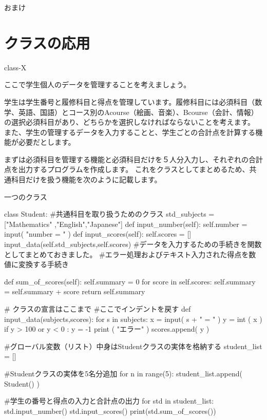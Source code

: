 \documentclass[11pt,a4paper,dvipdfmx,titlepage]{jsreport}
\begin{document}
{\gt \huge おまけ}
\section{クラスの応用}
\begin{pabox}{class-X}

ここで学生個人のデータを管理することを考えましょう。

学生は学生番号と履修科目と得点を管理しています。履修科目には必須科目（数学、英語、国語）とコース別のAcourse（絵画、音楽）、Bcourse（会計、情報）の選択必須科目があり、どちらかを選択しなければならないことを考えます。
また、学生の管理するデータを入力することと、学生ごとの合計点を計算する機能が必要だとします。

まずは必須科目を管理する機能と必須科目だけを５人分入力し、それぞれの合計点を出力するプログラムを作成します。
これをクラスとしてまとめるため、共通科目だけを扱う機能を次のように記載します。
\end{pabox}
\begin{codebox2}{一つのクラス}
\begin{listing}{1}
class Student: #共通科目を取り扱うためのクラス
    std_subjects = ["Mathematics" ,"English","Japanese"]
    def input_number(self):
            self.number = input( "number = " )
    def input_scores(self):
            self.scores = []
            input_data(self.std_subjects,self.scores)
        #データを入力するための手続きを関数としてまとめておきました。
        #エラー処理およびテキスト入力された得点を数値に変換する手続き

    def sum_of_scores(self):
            self.summary = 0
            for score in self.scores:
                self.summary = self.summary + score
        return self.summary

    # クラスの宣言はここまで
#ここでインデントを戻す
def input_data(subjects,scores):
    for s in subjects:
        x = input( s + " = " )
        y = int ( x )
        if y > 100 or y < 0 :
            y = -1
            print ( "エラー" )
        scores.append( y )

#グローバル変数（リスト）中身はStudentクラスの実体を格納する
student_list = []

#Studentクラスの実体を5名分追加
for n in range(5):
	student_list.append( Student() )

#学生の番号と得点の入力と合計点の出力
for std in student_list:
    std.input_number()
    std.input_scores()
    print(std.sum_of_scores())
\end{listing}
\end{codebox2}
\end{document}
